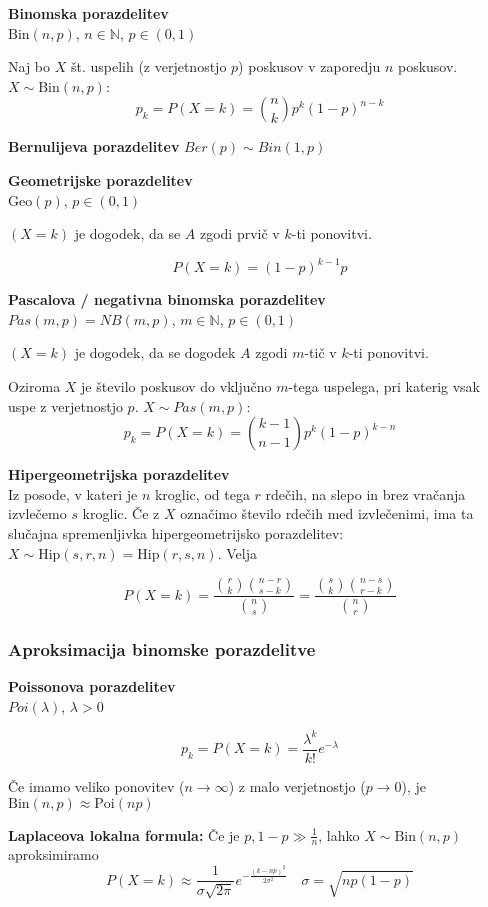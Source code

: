 \begin{multicols}{5}
\textbf{Binomska porazdelitev} \\
$\text{Bin}(n, p)$, $n \in \mathbb{N}$, $p \in (0,1)$

Naj bo $X$ št. uspelih (z verjetnostjo $p$) poskusov v zaporedju $n$ poskusov. $X \sim \text{Bin}(n, p)$:
\[ p_k = P(X = k) = \binom{n}{k} p^k (1-p)^{n-k}\]

\textbf{Bernulijeva porazdelitev} $Ber(p) \sim Bin(1, p)$

\textbf{Geometrijske porazdelitev} \\
$\text{Geo}(p)$,  $p \in (0,1)$

$(X = k)$ je dogodek, da se $A$ zgodi prvič v $k$-ti ponovitvi.

\[P(X = k) = (1-p)^{k-1} p\]

\textbf{Pascalova / negativna binomska porazdelitev} \\
$Pas(m, p) = NB(m, p)$, $m \in \mathbb{N}$, $p \in (0,1)$

$(X = k)$ je dogodek, da se dogodek $A$ zgodi $m$-tič v $k$-ti ponovitvi.

Oziroma $X$ je število poskusov do vključno $m$-tega uspelega, pri katerig vsak uspe z verjetnostjo $p$. $X \sim Pas(m, p)$:
\[ p_k = P(X = k) = \binom{k-1}{n-1} p^k (1-p)^{k-n}\]

\textbf{Hipergeometrijska porazdelitev} \\
Iz posode, v kateri je $n$ kroglic, od tega $r$ rdečih, na slepo in brez vračanja
izvlečemo $s$ kroglic. Če z $X$ označimo število rdečih med izvlečenimi, ima
ta slučajna spremenljivka hipergeometrijsko porazdelitev: $X \sim \text{Hip}(s, r, n) = \text{Hip}(r, s, n)$. Velja

\[ P(X = k) = \frac{\binom{r}{k} \binom{n-r}{s-k}}{\binom{n}{s}} = \frac{\binom{s}{k} \binom{n-s}{r-k}}{\binom{n}{r}}\]


\subsubsection{Aproksimacija binomske porazdelitve}
\textbf{Poissonova porazdelitev} \\
$Poi(\lambda)$, $\lambda > 0$

\[ p_k = P(X = k) = \frac{\lambda^k}{k!} e^{-\lambda}\]

Če imamo veliko ponovitev ($n \to \infty$) z malo verjetnostjo ($p \to 0$), je $\text{Bin}(n, p) \approx \text{Poi}(np)$

\textbf{Laplaceova lokalna formula: }
Če je $p, 1-p \gg \frac{1}{n}$, lahko $X \sim \text{Bin}(n, p)$ aproksimiramo
\[ P(X = k) \approx \frac{1}{\sigma\sqrt{2\pi}} e^{-\frac{(k-np)^2}{2\sigma^2}} \quad \sigma = \sqrt{np(1-p)} \]


\end{multicols}
